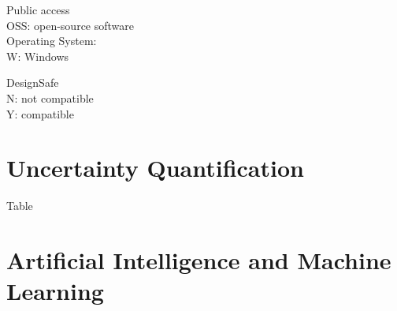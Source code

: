 \noindent Public access\\
OSS: open-source software\\

\noindent Operating System:\\
W: Windows

\noindent DesignSafe\\
N: not compatible\\
Y: compatible



\section{Uncertainty Quantification}
\label{sec:tools_list_uq}

Table

\section{Artificial Intelligence and Machine Learning}
\label{sec:tools_list_ai}


